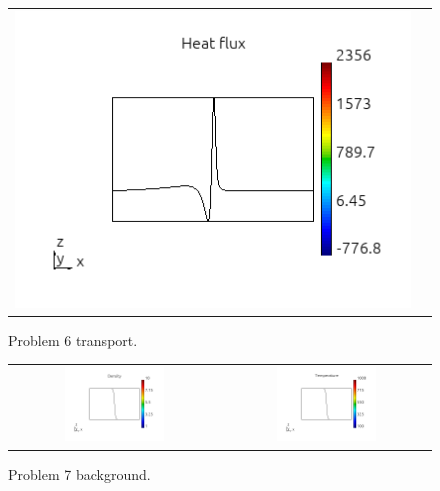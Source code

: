 \documentclass[review]{elsarticle}
\begin{document}
\begin{figure}[tbh]
\begin{center}
\begin{tabular}{cc}
      \includegraphics[width=\psize\textwidth]{figs/hflux_p61D5e7.png} 
    \end{tabular}
  \caption{
    Problem 6 transport.
  }
  \end{center}
  \label{fig:p6_Kn_hflux}
\end{figure}

\begin{figure}[tbh]
  \begin{center}
    \begin{tabular}{cc}
      \includegraphics[width=0.5\textwidth]{figs/density_p71D.png} &
      \includegraphics[width=0.5\textwidth]{figs/temperature_p71D.png}
    \end{tabular}
  \caption{
    Problem 7 background.
  }
  \end{center}
  \label{fig:p71D_rho_T}
\end{figure}
\end{document}
